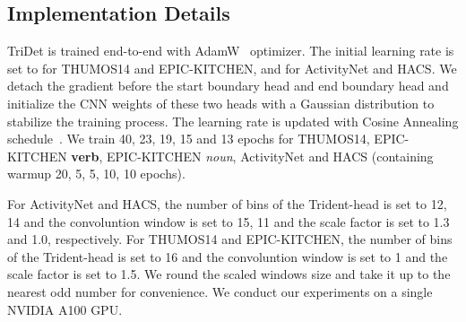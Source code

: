 \documentclass[10pt,twocolumn,letterpaper]{article}
\begin{document}
\begin{table}[t]
\end{table}


\subsection{Implementation Details}
TriDet is trained end-to-end with AdamW~\cite{loshchilov2018decoupled}
optimizer. The initial learning rate is set to  for THUMOS14 and EPIC-KITCHEN, and   for ActivityNet and HACS. We detach the gradient before the start boundary head and end boundary head and initialize the CNN weights of these two heads with a Gaussian distribution  to stabilize the training process. The learning rate is updated with Cosine Annealing schedule~\cite{loshchilov2017sgdr}. We train 40, 23, 19, 15 and 13 epochs for THUMOS14, EPIC-KITCHEN \textbf{verb}, EPIC-KITCHEN \emph{noun}, ActivityNet and HACS (containing warmup 20, 5, 5, 10, 10 epochs).

For ActivityNet and HACS, the number of bins  of the Trident-head is set to 12, 14 and the convoluntion window  is set to 15, 11 and the scale factor  is set to 1.3 and 1.0, respectively. 
For THUMOS14 and EPIC-KITCHEN, the number of bins  of the Trident-head is set to 16 and the convoluntion window  is set to 1 and the scale factor  is set to 1.5. We round the scaled windows size and take it up to the nearest odd number for convenience. We conduct our experiments on a single NVIDIA A100 GPU. 
\end{document}
